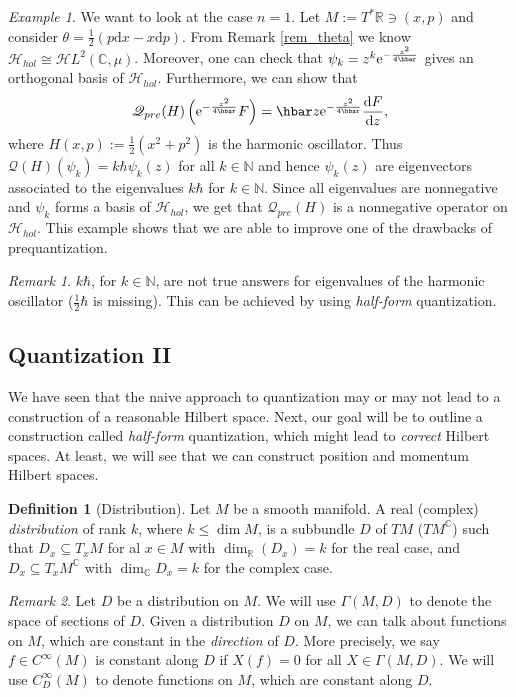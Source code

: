 \documentclass[12pt]{amsart}
\numberwithin{equation}{section}
\theoremstyle{plain}
\theoremstyle{definition}
\newtheorem{defn}{Definition}[subsection]
\theoremstyle{remark}
\newtheorem{rem}{Remark}[subsection]
\newtheorem{ex}{Example}[subsection]
\newcommand{\R}{\mathbb{R}}
\newcommand{\N}{\mathbb{N}}
\newcommand{\dd}{{\mathrm{d}}}
\newcommand{\calH}{\mathcal{H}}
\newcommand{\ee}{\textnormal{e}}
\begin{document}
\begin{ex}
We want to look at the case $n=1$. Let $M:=T^*\R\ni (x,p)$ and consider $\theta=\frac{1}{2}(p\dd x-x\dd p)$. From Remark \ref{rem_theta} we know $\calH_{hol}\cong \mathscr{H}L^2(\mathbb{C},\mu)$. Moreover, one can check that $\psi_k=z^k\ee^{-\frac{z^2}{4\hbar}}$ gives an orthogonal basis of $\calH_{hol}$. Furthermore, we can show that $$\mathscr{Q}_{pre}(H)\left(\ee^{-\frac{z^2}{4\hbar}}F\right)=\hbar z\ee^{-\frac{z^2}{4\hbar}}\frac{\dd F}{\dd z},$$
where $H(x,p):=\frac{1}{2}(x^2+p^2)$ is the harmonic oscillator. Thus $\mathscr{Q}(H)(\psi_k)=k\hbar\psi_k(z)$ for all $k\in\N$ and hence $\psi_k(z)$ are eigenvectors associated to the eigenvalues $k\hbar$ for $k\in\N$. Since all eigenvalues are nonnegative and $\psi_k$ forms a basis of $\calH_{hol}$, we get that $\mathscr{Q}_{pre}(H)$ is a nonnegative operator on $\calH_{hol}$. This example shows that we are able to improve one of the drawbacks of prequantization.
\end{ex}

\begin{rem}
$k\hbar$, for $k\in\N$, are not true answers for eigenvalues of the harmonic oscillator ($\frac{1}{2}\hbar$ is missing). This can be achieved by using \emph{half-form} quantization.
\end{rem}

\subsection{Quantization II}
We have seen that the naive approach to quantization may or may not lead to a construction of a reasonable Hilbert space. Next, our goal will be to outline a construction called \emph{half-form} quantization, which might lead to \emph{correct} Hilbert spaces. At least, we will see that we can construct position and momentum Hilbert spaces. 

\begin{defn}[Distribution]
Let $M$ be a smooth manifold. A real (complex) \emph{distribution} of rank $k$, where $k\leq \dim M$, is a subbundle $D$ of $TM$ ($TM^\mathbb{C}$) such that $D_x\subseteq T_xM$ for al $x\in M$ with $\dim_\R(D_x)=k$ for the real case, and $D_x\subseteq T_xM^\mathbb{C}$ with $\dim_\mathbb{C}D_x=k$ for the complex case.
\end{defn}

\begin{rem}
Let $D$ be a distribution on $M$. We will use $\Gamma(M,D)$ to denote the space of sections of $D$. Given a distribution $D$ on $M$, we can talk about functions on $M$, which are constant in the \emph{direction} of $D$. More precisely, we say $f\in C^\infty(M)$ is constant along $D$ if $X(f)=0$ for all $X\in \Gamma(M,D)$. We will use $C^\infty_D(M)$ to denote functions on $M$, which are constant along $D$.
\end{rem}
\end{document}
